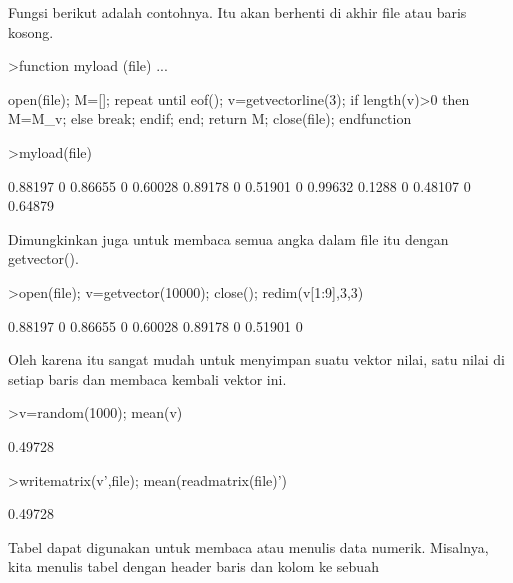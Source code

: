 \documentclass[a4paper,10pt]{article}
\begin{document}
\begin{eulernotebook}
\begin{eulercomment}
\begin{eulercomment}
\begin{eulercomment}
\begin{eulercomment}
\begin{eulercomment}
\begin{eulercomment}
\begin{eulercomment}
\begin{eulercomment}
\begin{eulercomment}
\begin{eulercomment}
\begin{eulercomment}
\begin{eulercomment}
\begin{eulercomment}
\begin{eulercomment}
\begin{eulercomment}
Fungsi berikut adalah contohnya. Itu akan berhenti di akhir file atau
baris kosong.
\end{eulercomment}
\begin{eulerprompt}
>function myload (file) ...
\end{eulerprompt}
\begin{eulerudf}
  open(file);
  M=[];
  repeat
     until eof();
     v=getvectorline(3);
     if length(v)>0 then M=M_v; else break; endif;
  end;
  return M;
  close(file);
  endfunction
\end{eulerudf}
\begin{eulerprompt}
>myload(file)
\end{eulerprompt}
\begin{euleroutput}
    0.88197         0   0.86655         0   0.60028 
    0.89178         0   0.51901         0   0.99632 
     0.1288         0   0.48107         0   0.64879 
\end{euleroutput}
\begin{eulercomment}
Dimungkinkan juga untuk membaca semua angka dalam file itu dengan
getvector().
\end{eulercomment}
\begin{eulerprompt}
>open(file); v=getvector(10000); close(); redim(v[1:9],3,3)
\end{eulerprompt}
\begin{euleroutput}
    0.88197         0   0.86655 
          0   0.60028   0.89178 
          0   0.51901         0 
\end{euleroutput}
\begin{eulercomment}
Oleh karena itu sangat mudah untuk menyimpan suatu vektor nilai, satu
nilai di setiap baris dan membaca kembali vektor ini.
\end{eulercomment}
\begin{eulerprompt}
>v=random(1000); mean(v)
\end{eulerprompt}
\begin{euleroutput}
  0.49728
\end{euleroutput}
\begin{eulerprompt}
>writematrix(v',file); mean(readmatrix(file)')
\end{eulerprompt}
\begin{euleroutput}
  0.49728
\end{euleroutput}
\begin{eulercomment}
Tabel dapat digunakan untuk membaca atau menulis data numerik.
Misalnya, kita menulis tabel dengan header baris dan kolom ke sebuah

\end{eulercomment}
\end{eulercomment}
\end{eulercomment}
\end{eulercomment}
\end{eulercomment}
\end{eulercomment}
\end{eulercomment}
\end{eulercomment}
\end{eulercomment}
\end{eulercomment}
\end{eulercomment}
\end{eulercomment}
\end{eulercomment}
\end{eulercomment}
\end{eulercomment}
\end{eulernotebook}
\end{document}
